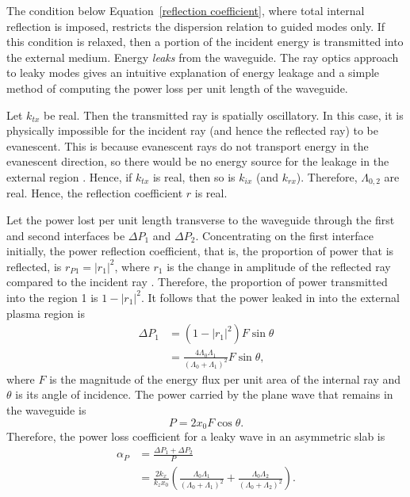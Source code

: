 	The condition below Equation~\eqref{reflection coefficient}, where total internal reflection is imposed, restricts the dispersion relation to guided modes only. If this condition is relaxed, then a portion of the incident energy is transmitted into the external medium. Energy \textit{leaks} from the waveguide. The ray optics approach to leaky modes gives an intuitive explanation of energy leakage and a simple method of computing the power loss per unit length of the waveguide.
	
	Let $k_{tx}$ be real. Then the transmitted ray is spatially oscillatory. In this case, it is physically impossible for the incident ray (and hence the reflected ray) to be evanescent. This is because evanescent rays do not transport energy in the evanescent direction, so there would be no energy source for the leakage in the external region \citep{goe_etal04}. Hence, if $k_{tx}$ is real, then so is $k_{ix}$ (and $k_{rx}$). Therefore, $\Lambda_{0, 2}$ are real. Hence, the reflection coefficient $r$ is real.
	
	Let the power lost per unit length transverse to the waveguide through the first and second interfaces be $\Delta P_1$ and $\Delta P_2$. Concentrating on the first interface initially, the power reflection coefficient, that is, the proportion of power that is reflected, is $r_{P1} = |r_1|^2$, where $r_1$ is the change in amplitude of the reflected ray compared to the incident ray \citep{mar74}. Therefore, the proportion of power transmitted into the region 1 is $1 - |r_1|^2$. It follows that the power leaked in into the external plasma region is
	\begin{align}
	\Delta P_1 &= (1 - |r_1|^2)F\sin{\theta} \\
	&= \frac{4\Lambda_0\Lambda_1}{(\Lambda_0 + \Lambda_1)^2}F\sin{\theta},
	\end{align}
	where $F$ is the magnitude of the energy flux per unit area of the internal ray and $\theta$ is its angle of incidence. The power carried by the plane wave that remains in the waveguide is
	\begin{equation}
	P = 2x_0F\cos{\theta}.
	\end{equation}
	Therefore, the power loss coefficient for a leaky wave in an asymmetric slab is
	\begin{align}
	\alpha_P &= \frac{\Delta P_1 + \Delta P_2}{P} \\
	&= \frac{2k_x}{k_zx_0}\left( \frac{\Lambda_0\Lambda_1}{(\Lambda_0 + \Lambda_1)^2} + \frac{\Lambda_0\Lambda_2}{(\Lambda_0 + \Lambda_2)^2} \right).
	\end{align}
	
